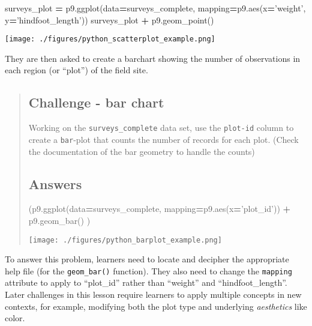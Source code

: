\documentclass[
]{book}
\newenvironment{Shaded}{\begin{snugshade}}{\end{snugshade}}
\newcommand{\NormalTok}[1]{#1}
\newcommand{\OperatorTok}[1]{\textcolor[rgb]{0.81,0.36,0.00}{\textbf{#1}}}
\newcommand{\StringTok}[1]{\textcolor[rgb]{0.31,0.60,0.02}{#1}}
\begin{document}
\begin{Shaded}
\begin{Highlighting}[]
\NormalTok{surveys_plot }\OperatorTok{=}\NormalTok{ p9.ggplot(data}\OperatorTok{=}\NormalTok{surveys_complete,}
\NormalTok{                         mapping}\OperatorTok{=}\NormalTok{p9.aes(x}\OperatorTok{=}\StringTok{'weight'}\NormalTok{, y}\OperatorTok{=}\StringTok{'hindfoot_length'}\NormalTok{))}
\NormalTok{surveys_plot }\OperatorTok{+}\NormalTok{ p9.geom_point()}
\end{Highlighting}
\end{Shaded}

\texttt{[image: ./figures/python\_scatterplot\_example.png]}

They are then asked to create a barchart showing the number of observations in each region
(or ``plot'') of the field site.

\begin{quote}
\hypertarget{challenge---bar-chart}{%
\subsection*{Challenge - bar chart}\label{challenge---bar-chart}}

Working on the \texttt{surveys\_complete} data set, use the \texttt{plot-id} column to
create a \texttt{bar}-plot that counts the number of records for each plot. (Check
the documentation of the bar geometry to handle the counts)

\hypertarget{answers}{%
\subsection*{Answers}\label{answers}}

\begin{Shaded}
\begin{Highlighting}[]
\NormalTok{(p9.ggplot(data}\OperatorTok{=}\NormalTok{surveys_complete,}
\NormalTok{           mapping}\OperatorTok{=}\NormalTok{p9.aes(x}\OperatorTok{=}\StringTok{'plot_id'}\NormalTok{))}
    \OperatorTok{+}\NormalTok{ p9.geom_bar()}
\NormalTok{)}
\end{Highlighting}
\end{Shaded}

\texttt{[image: ./figures/python\_barplot\_example.png]}
\end{quote}

To answer this problem, learners need to locate and decipher the appropriate help file (for
the \texttt{geom\_bar()} function). They also need to change the \texttt{mapping} attribute to apply to ``plot\_id'' rather than ``weight'' and ``hindfoot\_length''. Later challenges in this lesson require
learners to apply multiple concepts in new contexts, for example, modifying both the plot type
and underlying \emph{aesthetics} like color.
\end{document}
